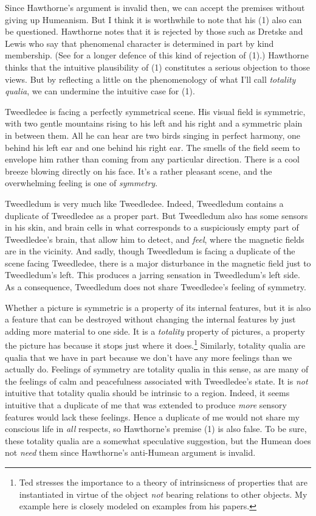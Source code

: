 Since Hawthorne's argument is invalid then, we can accept the premises without giving up Humeanism. But I think it is worthwhile to note that his (1) also can be questioned. Hawthorne notes that it is rejected by those such as Dretske and Lewis who say that phenomenal character is determined in part by kind membership. (See \citet{Lycan2001} for a longer defence of this kind of rejection of (1).) Hawthorne thinks that the intuitive plausibility of (1) constitutes a serious objection to those views. But by reflecting a little on the phenomenology of what I'll call \textit{totality qualia}, we can undermine the intuitive case for (1). 

Tweedledee is facing a perfectly symmetrical scene. His visual field is symmetric, with two gentle mountains rising to his left and his right and a symmetric plain in between them. All he can hear are two birds singing in perfect harmony, one behind his left ear and one behind his right ear. The smells of the field seem to envelope him rather than coming from any particular direction. There is a cool breeze blowing directly on his face. It's a rather pleasant scene, and the overwhelming feeling is one of \textit{symmetry}.

Tweedledum is very much like Tweedledee. Indeed, Tweedledum contains a duplicate of Tweedledee as a proper part. But Tweedledum also has some sensors in his skin, and brain cells in what corresponds to a suspiciously empty part of Tweedledee's brain, that allow him to detect, and \textit{feel}, where the magnetic fields are in the vicinity. And sadly, though Tweedledum is facing a duplicate of the scene facing Tweedledee, there is a major disturbance in the magnetic field just to Tweedledum's left. This produces a jarring sensation in Tweedledum's left side. As a consequence, Tweedledum does not share Tweedledee's feeling of symmetry.

Whether a picture is symmetric is a property of its internal features, but it is also a feature that can be destroyed without changing the internal features by just adding more material to one side. It is a \textit{totality} property of pictures, a property the picture has because it stops just where it does.\footnote{Ted \citet{Sider2001, Sider2003} stresses the importance to a theory of intrinsicness of properties that are instantiated in virtue of the object \textit{not} bearing relations to other objects. My example here is closely modeled on examples from his papers.} Similarly, totality qualia are qualia that we have in part because we don't have any more feelings than we actually do. Feelings of symmetry are totality qualia in this sense, as are many of the feelings of calm and peacefulness associated with Tweedledee's state. It is \textit{not} intuitive that totality qualia should be intrinsic to a region. Indeed, it seems intuitive that a duplicate of me that was extended to produce \textit{more} sensory features would lack these feelings. Hence a duplicate of me would not share my conscious life in \textit{all} respects, so Hawthorne's premise (1) is also false. To be sure, these totality qualia are a somewhat speculative suggestion, but the Humean does not \textit{need} them since Hawthorne's anti-Humean argument is invalid.
